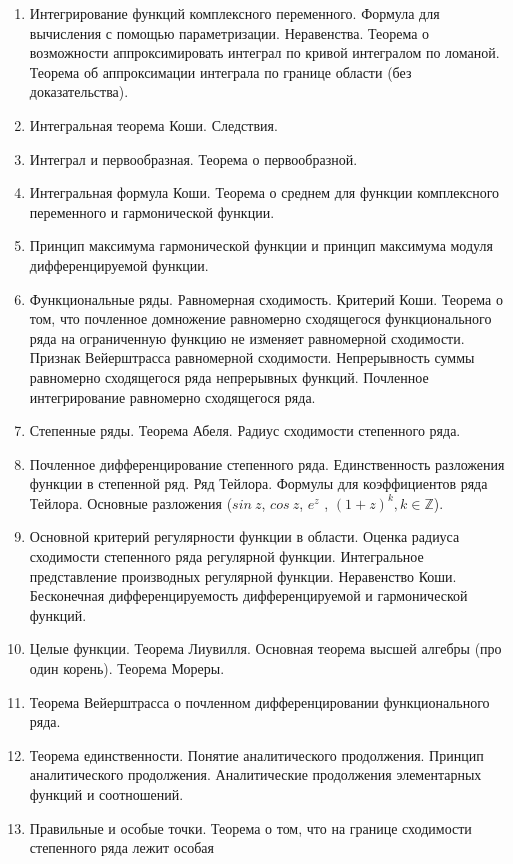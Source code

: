 \documentclass{article}
\begin{document}
\begin{enumerate}
	\item Интегрирование функций комплексного переменного. Формула для вычисления с помощью параметризации.
	      Неравенства. Теорема о возможности аппроксимировать интеграл по кривой интегралом по ломаной.
	      Теорема об аппроксимации интеграла по границе области (без доказательства).
	\item Интегральная теорема Коши. Следствия.
	\item Интеграл и первообразная. Теорема о первообразной.
	\item Интегральная формула Коши. Теорема о среднем для функции комплексного переменного и гармонической
	      функции.
	\item Принцип максимума гармонической функции и принцип максимума модуля дифференцируемой функции.
	\item Функциональные ряды. Равномерная сходимость. Критерий Коши. Теорема о том,
	      что почленное домножение равномерно сходящегося функционального ряда на ограниченную функцию не изменяет равномерной
	      сходимости. Признак Вейерштрасса равномерной сходимости.
	      Непрерывность суммы равномерно сходящегося ряда непрерывных функций. Почленное интегрирование равномерно сходящегося ряда.
	\item Степенные ряды. Теорема Абеля. Радиус сходимости степенного ряда.
	\item Почленное дифференцирование степенного ряда. Единственность разложения функции в степенной ряд.
	      Ряд Тейлора. Формулы для коэффициентов ряда Тейлора. Основные разложения ($sin\ z$, $cos\ z$, $e^z$ , $(1+z)^k, k \in
		      \mathbb{Z}$).
	\item Основной критерий регулярности функции в области. Оценка радиуса сходимости степенного ряда регулярной функции.
	      Интегральное представление производных регулярной функции. Неравенство Коши.
	      Бесконечная дифференцируемость дифференцируемой и гармонической функций.
	\item Целые функции. Теорема Лиувилля. Основная теорема высшей алгебры (про один корень). Теорема Мореры.
	\item Теорема Вейерштрасса о почленном дифференцировании функционального ряда.
	\item Теорема единственности. Понятие аналитического продолжения. Принцип аналитического продолжения.
	      Аналитические продолжения элементарных функций и соотношений.
	\item Правильные и особые точки. Теорема о том, что на границе сходимости степенного ряда лежит особая

\end{enumerate}
\end{document}

